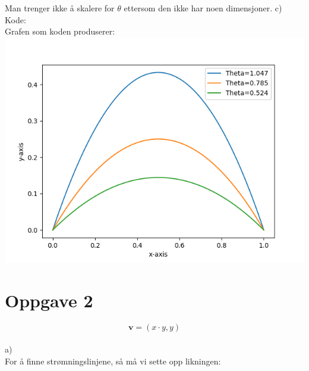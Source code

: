 \documentclass[12pt, a4paper]{article}
\begin{document}
Man trenger ikke å skalere for $\theta$ ettersom den ikke har noen dimensjoner.
\newpage
c) \\
Kode: \\

\newpage
Grafen som koden produserer: \\
\hspace*{-1.5cm}
\includegraphics{one_c_revised.png}

\newpage
\section*{Oppgave 2}

\begin{equation}
    \textbf{v} = (x \cdot y, y)
\end{equation}
\\
a) \\
For å finne strømningslinjene, så må vi sette opp likningen:
\end{document}
